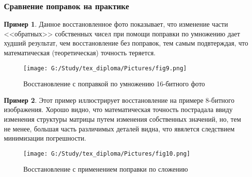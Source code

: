 \documentclass[a4paper]{article}
\theoremstyle{definition}
\newtheorem*{example}{Пример}
\begin{document}
\newpage

\subsubsection{Сравнение поправок на практике}


\begin{example}

Данное восстановленное фото показывает, что изменение части <<обратных>>  собственных чисел при помощи поправки по умножению дает худший результат, чем восстановление без поправок, тем самым подвтерждая, что математическая (теоретическая) точность теряется.


\begin{minipage}{150mm}
    \begin{figure}[H]
            \texttt{[image: G:/Study/tex\_diploma/Pictures/fig9.png]}
            \label{Pic9}
            \caption[Восстановление с поправкой по умножению 16-битного фото]{Восстановление с поправкой по умножению 16-битного фото}
        \end{figure}
\end{minipage}
\hfill
\vspace*{2mm}

\end{example}


\newpage


\begin{example}

Этот пример иллюстрирует восстановление на примере 8-битного изображения. Хорошо видно, что математическая точность пострадала ввиду изменения структуры матрицы путем изменения собственных значений, но, тем не менее, большая часть различимых деталей видна, что явялется следствием минимизации погрешности.


\begin{minipage}{150mm}
  \begin{figure}[H]
            \texttt{[image: G:/Study/tex\_diploma/Pictures/fig10.png]}
            \label{Pic10}
            \caption[Восстановление с применением поправки по сложению]{Восстановление с применением поправки по сложению}
        \end{figure}
\end{minipage}
\hfill
\vspace*{2mm}

\end{example}
\end{document}
